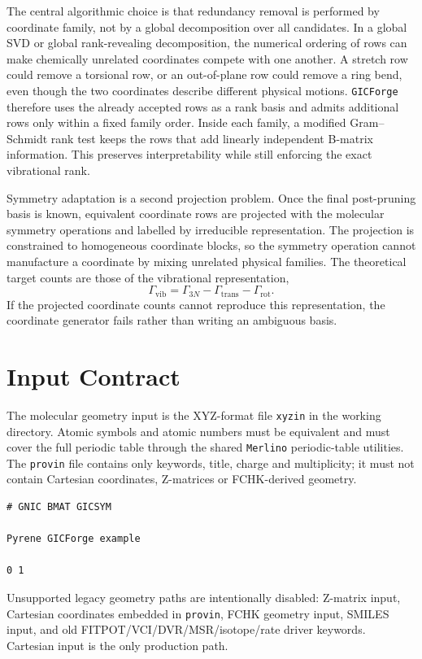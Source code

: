 \documentclass[11pt]{article}
\newcommand{\program}{\texttt{GICForge}}
\newcommand{\merlino}{\texttt{Merlino}}
\newcommand{\xyzin}{\texttt{xyzin}}
\newcommand{\provin}{\texttt{provin}}
\begin{document}
The central algorithmic choice is that redundancy removal is performed by
coordinate family, not by a global decomposition over all candidates.  In a
global SVD or global rank-revealing decomposition, the numerical ordering of
rows can make chemically unrelated coordinates compete with one another.  A
stretch row could remove a torsional row, or an out-of-plane row could remove a
ring bend, even though the two coordinates describe different physical
motions.  \program{} therefore uses the already accepted rows as a rank basis
and admits additional rows only within a fixed family order.  Inside each
family, a modified Gram--Schmidt rank test keeps the rows that add linearly
independent B-matrix information.  This preserves interpretability while still
enforcing the exact vibrational rank.

Symmetry adaptation is a second projection problem.  Once the final
post-pruning basis is known, equivalent coordinate rows are projected with the
molecular symmetry operations and labelled by irreducible representation.  The
projection is constrained to homogeneous coordinate blocks, so the symmetry
operation cannot manufacture a coordinate by mixing unrelated physical
families.  The theoretical target counts are those of the vibrational
representation,
\[
  \Gamma_\mathrm{vib} = \Gamma_{3N}-\Gamma_\mathrm{trans}-\Gamma_\mathrm{rot}.
\]
If the projected coordinate counts cannot reproduce this representation, the
coordinate generator fails rather than writing an ambiguous basis.

\section{Input Contract}

The molecular geometry input is the XYZ-format file \xyzin{} in the working
directory.  Atomic symbols and atomic numbers must be equivalent and must cover
the full periodic table through the shared \merlino{} periodic-table utilities.
The \provin{} file contains only keywords, title, charge and multiplicity; it
must not contain Cartesian coordinates, Z-matrices or FCHK-derived geometry.

\begin{lstlisting}[style=merlino]
# GNIC BMAT GICSYM

Pyrene GICForge example

0 1
\end{lstlisting}

Unsupported legacy geometry paths are intentionally disabled: Z-matrix input,
Cartesian coordinates embedded in \provin{}, FCHK geometry input, SMILES input,
and old FITPOT/VCI/DVR/MSR/isotope/rate driver keywords.  Cartesian input is the
only production path.
\end{document}
